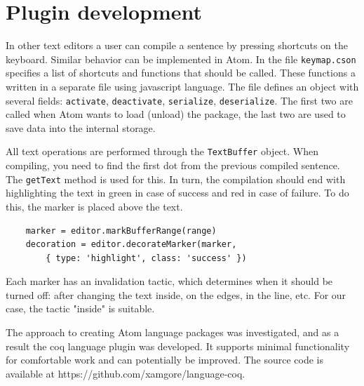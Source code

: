 \newpage

\section{Plugin development}

In other text editors a user can compile a sentence by pressing shortcuts on the keyboard. Similar behavior can be implemented in Atom. In the file \texttt{keymap.cson} specifies a list of shortcuts and functions that should be called. These functions a written in a separate file using javascript language. The file defines an object with several fields: \texttt{activate}, \texttt{deactivate}, \texttt{serialize}, \texttt{deserialize}. The first two are called when Atom wants to load (unload) the package, the last two are used to save data into the internal storage.

All text operations are performed through the \texttt{TextBuffer} object. When compiling, you need to find the first dot from the previous compiled sentence. The \texttt{getText} method is used for this. In turn, the compilation should end with highlighting the text in green in case of success and red in case of failure. To do this, the marker is placed above the text.

\begin{lstlisting}
    marker = editor.markBufferRange(range)
    decoration = editor.decorateMarker(marker, 
        { type: 'highlight', class: 'success' })
\end{lstlisting}

Each marker has an invalidation tactic, which determines when it should be turned off: after changing the text inside, on the edges, in the line, etc. For our case, the tactic "inside" is suitable.





\newpage

\Conc

The approach to creating Atom language packages was investigated, and as a result the coq language plugin was developed. It supports minimal functionality for comfortable work and can potentially be improved. The source code is available at https://github.com/xamgore/language-coq.



\printbibliography[%
    heading=bibintoc%
    ,title=Bibliography %
]

